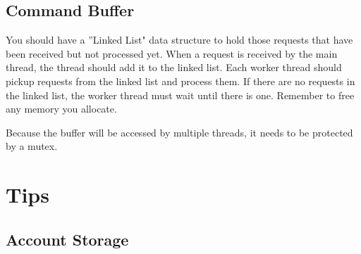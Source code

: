 \documentclass[letterpaper,10pt]{article}
\begin{document}
\subsection{Command Buffer}
%
%

You should have a ''Linked List" data structure to hold those requests that have been received but not
processed yet. When a request is received by the main thread, the thread should add it to the linked list.
Each worker thread should pickup requests from the linked list and process them. If there are no requests
in the linked list, the worker thread must wait until there is one. Remember to free any memory you
allocate.

Because the buffer will be accessed by multiple threads, it needs to be protected by a mutex.



\section{Tips}

\subsection{Account Storage}
\end{document}
